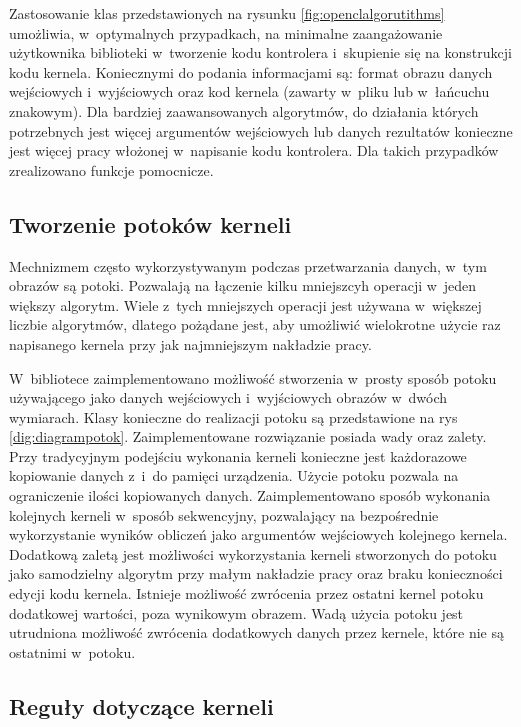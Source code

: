 Zastosowanie klas przedstawionych na rysunku \ref{fig:openclalgorutithms} umożliwia, w~optymalnych przypadkach, na minimalne zaangażowanie użytkownika biblioteki w~tworzenie kodu kontrolera i~skupienie się na konstrukcji kodu kernela. Koniecznymi do podania informacjami są: format obrazu danych wejściowych i~wyjściowych oraz kod kernela (zawarty w~pliku lub w~łańcuchu znakowym). Dla bardziej zaawansowanych algorytmów, do działania których potrzebnych jest więcej argumentów wejściowych lub danych rezultatów konieczne jest więcej pracy włożonej w~napisanie kodu kontrolera. Dla takich przypadków zrealizowano funkcje pomocnicze.

\subsection{Tworzenie potoków kerneli}
\label{subsec:potokikerneli}

Mechnizmem często wykorzystywanym podczas przetwarzania danych, w~tym obrazów są potoki. Pozwalają na łączenie kilku mniejszcyh operacji w~jeden większy algorytm. Wiele z~tych mniejszych operacji jest używana w~większej liczbie algorytmów, dlatego pożądane jest, aby umożliwić wielokrotne użycie raz napisanego kernela przy jak najmniejszym nakładzie pracy.

W~bibliotece zaimplementowano możliwość stworzenia w~prosty sposób potoku używającego jako danych wejściowych i~wyjściowych obrazów w~dwóch wymiarach. Klasy konieczne do realizacji potoku są przedstawione na rys \ref{dig:diagrampotok}. Zaimplementowane rozwiązanie posiada wady oraz zalety. Przy tradycyjnym podejściu wykonania kerneli konieczne jest każdorazowe kopiowanie danych z~i~do pamięci urządzenia. Użycie potoku pozwala na ograniczenie ilości kopiowanych danych. Zaimplementowano sposób wykonania kolejnych kerneli w~sposób sekwencyjny, pozwalający na bezpośrednie wykorzystanie wyników obliczeń jako argumentów wejściowych kolejnego kernela. Dodatkową zaletą jest możliwości wykorzystania kerneli stworzonych do potoku jako samodzielny algorytm przy małym nakładzie pracy oraz braku konieczności edycji kodu kernela. Istnieje możliwość zwrócenia przez ostatni kernel potoku dodatkowej wartości, poza wynikowym obrazem. Wadą użycia potoku jest utrudniona możliwość zwrócenia dodatkowych danych przez kernele, które nie są ostatnimi w~potoku.

\subsection{Reguły dotyczące kerneli}
\label{subsec:regulykerneli}

